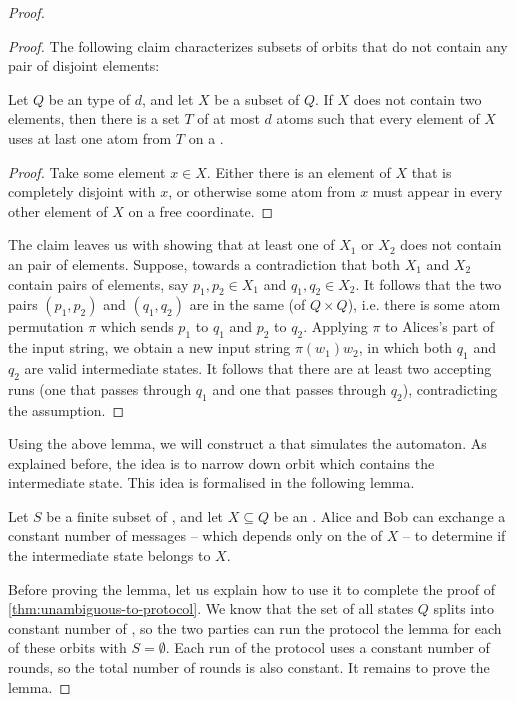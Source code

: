 \begin{proof}
\begin{proof}
The following claim characterizes subsets of orbits that do not contain any pair of disjoint elements:
\begin{claim}\label{claim:sunflower}
  Let $Q$ be an  type of  $d$, and let $X$ be a subset of $Q$.
  If $X$ does not contain two  elements, then there is a
  set $T$ of at most $d$ atoms such that every element of $X$ uses at last one atom from $T$ on a .
\end{claim}
\begin{proof}
        Take some element $x \in X$. Either there is an element of $X$ that is completely disjoint with $x$, or otherwise some atom from $x$ must appear in every other element of $X$ on a free coordinate.
\end{proof}

The claim leaves us with showing that at least one of $X_1$ or $X_2$ does not
contain an  pair of elements. Suppose, towards a contradiction that
both $X_1$ and $X_2$ contain  pairs of elements, say $p_1, p_2 \in
X_1$ and $q_1, q_2 \in X_2$. It follows that the two pairs $(p_1,p_2)$ and
$(q_1,q_2)$ are in the same  (of $Q \times Q$), i.e. there is
some atom permutation $\pi$ which sends $p_1$ to $q_1$ and $p_2$ to $q_2$.
Applying $\pi$ to Alices's part of the input string, we obtain a new input
string $\pi(w_1) w_2$, in which both $q_1$ and $q_2$ are valid intermediate
states. It follows that there are at least two accepting runs (one that passes
through $q_1$ and one that passes through $q_2$), contradicting the 
assumption. 
\end{proof}

Using the above lemma, we will construct a  that
simulates the automaton. As explained before, the idea is to narrow down orbit
which contains the intermediate state. This idea is formalised in the following
lemma. 


\begin{lemma}\label{lem:narrow-down-orbit}
  Let $S$ be a finite subset of , and let $X \subseteq Q$ be an . 
  Alice and Bob can exchange a constant number of messages
  -- which depends only on the  of $X$ -- 
  to determine if the intermediate state belongs to $X$. 
\end{lemma}

Before proving the lemma, let us explain how to use it to complete the proof of
\cref{thm:unambiguous-to-protocol}. We know that the set of all states $Q$
splits into constant number of , so the two parties can run
the protocol the lemma for each of these orbits with $S=\emptyset$. Each run of
the protocol uses a constant number of rounds, so the total number of rounds is
also constant. It remains to prove the lemma.


\end{proof}
